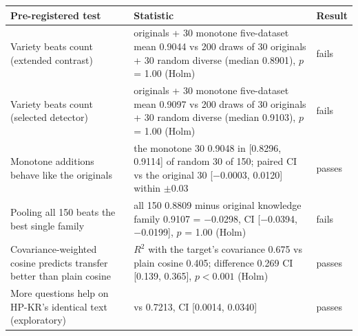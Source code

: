 \begin{tabular}{@{}l >{\raggedright\arraybackslash}p{5.6cm} l@{}}
\toprule
Pre-registered test & Statistic & Result \\
\midrule
Variety beats count (extended contrast) & 30 originals + 30 monotone five-dataset mean 0.9044 vs 200 draws of 30 originals + 30 random diverse (median 0.8901), $p$ = 1.00 (Holm) & fails \\
Variety beats count (selected detector) & 30 originals + 30 monotone five-dataset mean 0.9097 vs 200 draws of 30 originals + 30 random diverse (median 0.9103), $p$ = 1.00 (Holm) & fails \\
Monotone additions behave like the originals & the monotone 30 0.9048 in [0.8296, 0.9114] of random 30 of 150; paired CI vs the original 30 [$-$0.0003, 0.0120] within $\pm$0.03 & passes \\
Pooling all 150 beats the best single family & all 150 0.8809 minus original knowledge family 0.9107 = $-$0.0298, CI [$-$0.0394, $-$0.0199], $p$ = 1.00 (Holm) & fails \\
Covariance-weighted cosine predicts transfer better than plain cosine & $R^2$ with the target's covariance 0.675 vs plain cosine 0.405; difference 0.269 CI [0.139, 0.365], $p < 0.001$ (Holm) & passes \\
More questions help on HP-KR's identical text (exploratory) & 0.7392 vs 0.7213, CI [0.0014, 0.0340] & passes \\
\bottomrule
\end{tabular}
